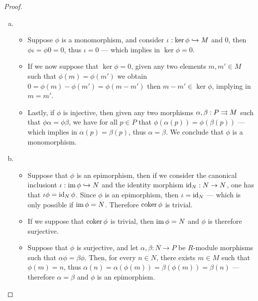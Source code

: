 \begin{proof}
\begin{enumerate}[(a)]\setlength\itemsep{0em}
\item
  \begin{itemize}\setlength\itemsep{0em}
\item Suppose \(\phi\) is a monomorphism, and consider
  \(\iota: \ker \phi \hookrightarrow M\) and \(0\), then \(\phi \iota = \phi 0 = 0\), thus
  \(\iota = 0\) --- which implies in \(\ker \phi = 0\).

\item If we now suppose that \(\ker \phi = 0\), given any two elements
  \(m, m' \in M\) such that \(\phi(m) = \phi(m')\) we obtain
  \(0 = \phi(m) - \phi(m') = \phi(m - m')\) then \(m - m' \in \ker \phi\),
  implying in \(m = m'\).
\item Lastly, if \(\phi\) is injective, then given any two morphisms
  \(\alpha, \beta: P \rightrightarrows M\) such that \(\phi \alpha = \phi \beta\), we have
  for all \(p \in P\) that \(\phi(\alpha(p)) = \phi(\beta(p))\) --- which
  implies in \(\alpha(p) = \beta(p)\), thus \(\alpha = \beta\). We conclude that
  \(\phi\) is a monomorphism.
  \end{itemize}

\item
  \begin{itemize}\setlength\itemsep{0em}
\item Suppose that \(\phi\) is an epimorphism, then if we consider the canonical
  inclusiont \(\iota: \operatorname{im} \phi \hookrightarrow N\) and the identity morphism
  \(\operatorname{id}_N: N \to N\), one has that \(\iota \phi = \operatorname{id}_N \phi\). Since \(\phi\)
  is an epimorphism, then \(\iota = \operatorname{id}_N\) --- which is only possible if
  \(\operatorname{im} \phi = N\). Therefore \(\operatorname{coker} \phi\) is trivial.

\item If we suppose that \(\operatorname{coker} \phi\) is trivial, then \(\operatorname{im} \phi = N\) and
  \(\phi\) is therefore surjective.

\item Suppose that \(\phi\) is surjective, and let \(\alpha, \beta: N \to P\) be
  \(R\)-module morphisms such that \(\alpha \phi = \beta \phi\). Then, for every
  \(n \in N\), there exists \(m \in M\) such that \(\phi(m) = n\), thus
  \(\alpha(n) = \alpha(\phi(m)) = \beta(\phi(m)) = \beta(n)\) --- therefore
  \(\alpha = \beta\) and \(\phi\) is an epimorphism.
  \end{itemize}
\end{enumerate}
\end{proof}

